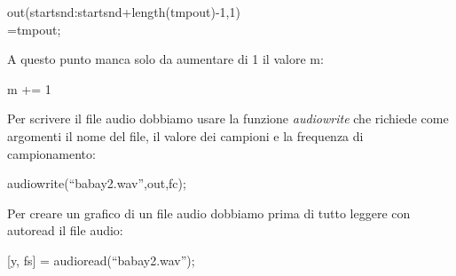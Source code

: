 \documentclass[11pt]{article}
\begin{document}
\begin{multicols*}{2}
\begin{center}
\begin{minipage}[c]{7cm}
\begin{sffamily}
out(startsnd:startsnd+length(tmpout)-1,1)\\=tmpout;

\end{sffamily}
\end{minipage}
\end{center}

\noindent A questo punto manca solo da aumentare di 1 il valore m:

\vspace{0.3cm}

\begin{center}
\begin{minipage}[c]{2cm}
\begin{sffamily}

m += 1\\

\end{sffamily}
\end{minipage}
\end{center}

\noindent Per scrivere il file audio dobbiamo usare la funzione \textit {audiowrite} che richiede come argomenti il nome del file, il valore dei campioni e la frequenza di campionamento:

\vspace{0.3cm}

\begin{center}
\begin{minipage}[c]{5cm}
\begin{sffamily}

audiowrite(“babay2.wav”,out,fc);\\

\end{sffamily}
\end{minipage}
\end{center}

\noindent Per creare un grafico di un file audio dobbiamo prima di tutto leggere con autoread il file audio:

\vspace{0.3cm}

\begin{center}
\begin{minipage}[c]{6cm}
\begin{sffamily}

[y, fs] = audioread(“babay2.wav”);\\

\end{sffamily}
\end{minipage}
\end{center}


\end{multicols*}
\end{document}
